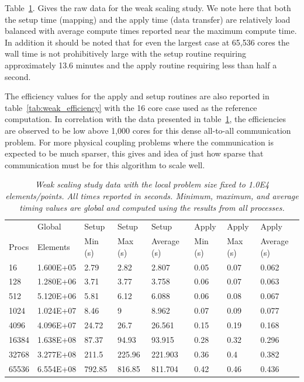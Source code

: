 \documentclass[note]{TechNote}
\begin{document}
Table~\ref{tab:weak_scaling}. Gives the raw data for the weak scaling
study. We note here that both the setup time (mapping) and the apply
time (data transfer) are relatively load balanced with average compute
times reported near the maximum compute time. In addition it should be
noted that for even the largest case at 65,536 cores the wall time is
not prohibitively large with the setup routine requiring approximately
13.6 minutes and the apply routine requiring less than half a second.

The efficiency values for the apply and setup routines are also
reported in table~\ref{tab:weak_efficiency} with the 16 core case used
as the reference computation. In correlation with the data presented
in table~\ref{tab:weak_scaling}, the efficiencies are observed to be
low above 1,000 cores for this dense all-to-all communication
problem. For more physical coupling problems where the communication
is expected to be much sparser, this gives and idea of just how sparse
that communication must be for this algorithm to scale well.

\begin{table}[htpb!]
  \begin{center}
    \begin{tabular}{llllllll}\hline\hline
      \multicolumn{1}{l}{} & 
      \multicolumn{1}{l}{Global} & 
      \multicolumn{1}{l}{Setup} & 
      \multicolumn{1}{l}{Setup} & 
      \multicolumn{1}{l}{Setup} & 
      \multicolumn{1}{l}{Apply} & 
      \multicolumn{1}{l}{Apply} & 
      \multicolumn{1}{l}{Apply}\\
      \multicolumn{1}{l}{Procs} & 
      \multicolumn{1}{l}{Elements} & 
      \multicolumn{1}{l}{Min (s)} & 
      \multicolumn{1}{l}{Max (s)} & 
      \multicolumn{1}{l}{Average (s)} & 
      \multicolumn{1}{l}{Min (s)} & 
      \multicolumn{1}{l}{Max (s)} & 
      \multicolumn{1}{l}{Average (s)}\\ \hline\hline
16 &	1.600E+05 & 2.79 &	2.82 &	  2.807 &	0.05 & 0.07 &	0.062 \\
128 &	1.280E+06 & 3.71 &	3.77 &	  3.758 &	0.06 &	0.07 &	0.063 \\
512 &	5.120E+06 & 5.81 &	6.12 &	  6.088 &	0.06 &	0.08 &	0.067 \\
1024 &	1.024E+07 & 8.46 &	9 &       8.962 &	0.07 &	0.09 &	0.077 \\
4096 &	4.096E+07 & 24.72 &	26.7 &	  26.561 &	0.15 &	0.19 &	0.168 \\
16384 &	1.638E+08 & 87.37 &	94.93 &	  93.915 &	0.28 &	0.32 &	0.296 \\
32768 &	3.277E+08 & 211.5 &	225.96 &  221.903 &	0.36 &	0.4 &	0.382 \\
65536 &	6.554E+08 & 792.85 & 816.85	& 811.704 &	0.42 &	0.46 &	0.436 \\
      \hline\hline
    \end{tabular}
  \end{center}
  \caption{\sl Weak scaling study data with the local problem size
    fixed to 1.0E4 elements/points. All times reported in
    seconds. Minimum, maximum, and average timing values are global
    and computed using the results from all processes.}
  \label{tab:weak_scaling}
\end{table}
\end{document}
